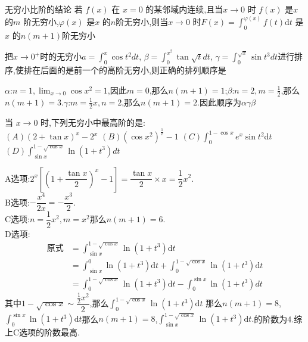 \documentclass[8pt a4paper, oneside, UTF8]{ctexbook}
\begin{document}
\begin{sloppypar}
    \begin{conclusion}{无穷小比阶的结论}{}
        若 $f(x)$ 在 $x=0$ 的某邻域内连续,且当$x\to0$ 时 $f(x)$ 是$x$的$m$ 阶无穷小,$\varphi(x)$ 是$x$ 的$n$阶无穷小,则当$x\to0$ 时$F( x) = \int _0^{\varphi(x)}f(t)$d$t$ 是$x$ 的$n(m+1)$阶无穷小
    \end{conclusion}
    \begin{problem}
        把$x\to 0^+$时的无穷小$a= \int _0^x \cos t^2dt$, $\beta= \int _0^{x^2} \tan\sqrt{t} dt$, $\gamma= \int _0^{\sqrt{x}} \sin t^3 dt$进行排序,使排在后面的是前一个的高阶无穷小,则正确的排列顺序是
    \end{problem}
    \begin{solution}
        $\alpha$:$n=1,\lim_{x\to 0} \cos x^2=1$,因此$m=0$,那么$n(m+1)=1$;$\beta$:$n=2,m=\frac{1}{2}$,那么$n(m+1)=3$.$\gamma$:$m=\frac{1}{2}x,n=2$,那么$n(m+1)=2$.因此顺序为$\alpha \gamma \beta$
    \end{solution}
    \begin{problem}
        当 $x\to0$ 时,下列无穷小中最高阶的是:\\
        $\left(A\right)\left(2+\tan x\right)^{x}-2^{x}$ \qquad $\left(B\right)\left(\cos x^{2}\right)^{\frac{1}{x}}-1$ \qquad $( C) \int _0^{1- \cos x}e^{x}\sin t^2$d$t$ \qquad$\left(D\right)\int_{\sin x}^{1-\sqrt{\cos x}}\ln(1+t^{3})dt$
    \end{problem}
    \begin{solution}
        A选项:$2^x[(1+\dfrac{\tan x}{2})^x-1]=\dfrac{\tan x}{2}\times x=\dfrac{1}{2}x^2$.\\
        B选项:$-\dfrac{x^4}{2x}=-\dfrac{x^3}{2}$.\\
        C选项:$n=\dfrac{1}{2}x^2,m=x^2$那么$n(m+1)=6$.\\
        D选项:\begin{align*}
          \text{原式} & = \int_{\sin x}^{1-\sqrt{\cos x}}\ln(1+t^3) \mathrm{d}t \\
          & = \int_{\sin x}^0\ln(1+t^3) \mathrm{d}t+\int_0^{1-\sqrt{\cos x}}\ln(1+t^3) \mathrm{d}t \\
          & = \int_{0}^{1-\sqrt{\cos x}}\ln(1+t^{3})\mathrm{d}t-\int_{0}^{\sin x}\ln(1+t^{3})dt
        \end{align*}
        其中$1-\sqrt{\cos x}\sim\dfrac{\frac12x^2}2$,那么$\int_0^{1-\sqrt{\cos x}}\ln(1+t^3) \mathrm{d}t$
        那么$n(m+1)=8$,$\int_0^{\sin x}\ln\left(1+t^3\right)\mathrm{d}t$那么$n(m+1)=8$,$\int_{\sin x}^{1-\sqrt{\cos x}}\ln(1+t^3) \mathrm{d}t.$的阶数为4.综上C选项的阶数最高.
    \end{solution}

\end{sloppypar}
\end{document}
